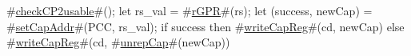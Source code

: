 #\hyperref[sailMIPSzcheckCP2usable]{checkCP2usable}#();
let rs_val = #\hyperref[sailMIPSzrGPR]{rGPR}#(rs);
let (success, newCap) = #\hyperref[sailMIPSzsetCapAddr]{setCapAddr}#(PCC, rs_val);
if success then
    #\hyperref[sailMIPSzwriteCapReg]{writeCapReg}#(cd, newCap)
else
    #\hyperref[sailMIPSzwriteCapReg]{writeCapReg}#(cd, #\hyperref[sailMIPSzunrepCap]{unrepCap}#(newCap))
